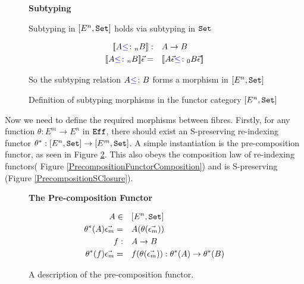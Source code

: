 \documentclass{Report}
\begin{document}
\begin{figure}
    \begin{framed}
        
\centering\textbf{Subtyping}


Subtyping in $[E^n, \texttt{Set}]$ holds via subtyping in $\texttt{Set}$

\begin{align*}
    {\bf [\![}A{\color{blue} \leq\colon}_n B{\bf ]\!]}:&\quad A\rightarrow B\\
    {\bf [\![}A{\color{blue} \leq\colon}_n B{\bf ]\!]}\vec{\epsilon}=&\quad {\bf [\![}A\vec{\epsilon}{\color{blue} \leq\colon}_0 B\vec{\epsilon}{\bf ]\!]}
\end{align*}

So the subtyping relation $A {\color{blue} \leq\colon} B$ forms a morphism in $[E^n, \texttt{Set}]$

    \end{framed}
    \caption{Definition of subtyping morphisms in the functor category $[E^n, \texttt{Set}]$}
    \label{HowToBuildSubtyping}
\end{figure}

Now we need to define the required morphisms between fibres. Firstly, for any function $\theta: E^m \rightarrow E^n$ in $\texttt{Eff}$, there should exist an S-preserving re-indexing functor $\theta^*: [E^n, \texttt{Set}] \rightarrow [E^m, \texttt{Set}]$. A simple instantiation is the pre-composition functor, as seen in Figure \ref{PrecompositionFunctor}. This also obeys the composition law of re-indexing functors( Figure \ref{PrecompositionFunctorComposition}) and is S-preserving (Figure \ref{PrecompositionSClosure}).


\begin{figure}
    \begin{framed}
        \centering
        \textbf{The Pre-composition Functor}

        \begin{align*}
            A\in&\quad [E^n, \texttt{Set}]\\
            \theta^*(A) \vec{\epsilon_m} =&\quad  A(\theta(\vec{\epsilon_m}))\\
            f:&\quad A \rightarrow B\\
            \theta^*(f) \vec{\epsilon_m} =&\quad f(\theta(\vec{\epsilon_m})): \theta^*(A) \rightarrow \theta^*(B)\\
        \end{align*}
    \end{framed}
    \caption{A description of the pre-composition functor.}
    \label{PrecompositionFunctor}
\end{figure}
\end{document}
